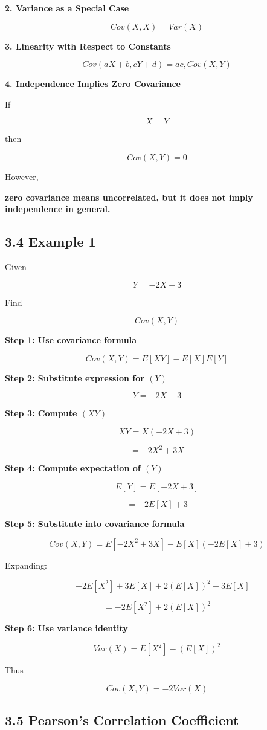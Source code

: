 \documentclass[12pt]{article}
\begin{document}
\textbf{2. Variance as a Special Case}

\[
Cov(X,X)=Var(X)
\]

\textbf{3. Linearity with Respect to Constants}

\[
Cov(aX+b,cY+d)=ac,Cov(X,Y)
\]

\textbf{4. Independence Implies Zero Covariance}

If

\[
X \perp Y
\]

then

\[
Cov(X,Y)=0
\]

However,

\textbf{zero covariance means uncorrelated, but it does not imply independence in general.}

\subsection*{3.4 Example 1}

Given

\[
Y=-2X+3
\]

Find

\[
Cov(X,Y)
\]

\textbf{Step 1: Use covariance formula}

\[
Cov(X,Y)=E[XY]-E[X]E[Y]
\]

\textbf{Step 2: Substitute expression for $(Y)$}

\[
Y=-2X+3
\]

\textbf{Step 3: Compute $(XY)$}

\[
XY=X(-2X+3)
\]

\[
=-2X^2+3X
\]

\textbf{Step 4: Compute expectation of $(Y)$}

\[
E[Y]=E[-2X+3]
\]

\[
=-2E[X]+3
\]

\textbf{Step 5: Substitute into covariance formula}

\[
Cov(X,Y)=E[-2X^2+3X]-E[X](-2E[X]+3)
\]

Expanding:

\[
=-2E[X^2]+3E[X]+2(E[X])^2-3E[X]
\]

\[
=-2E[X^2]+2(E[X])^2
\]

\textbf{Step 6: Use variance identity}

\[
Var(X)=E[X^2]-(E[X])^2
\]

Thus

\[
Cov(X,Y)=-2Var(X)
\]

\subsection*{3.5 Pearson’s Correlation Coefficient}
\end{document}
